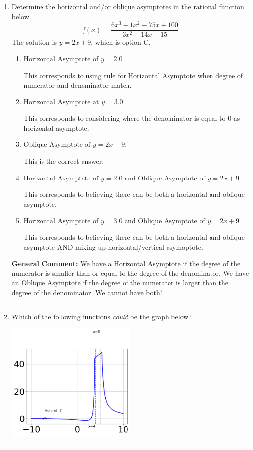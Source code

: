 \documentclass{extbook}[14pt]
\newcommand{\litem}[1]{\item #1

\rule{\textwidth}{0.4pt}}
\begin{document}
\begin{enumerate}\litem{
Determine the horizontal and/or oblique asymptotes in the rational function below.
\[ f(x) = \frac{6x^{3} -1 x^{2} -75 x + 100}{3x^{2} -14 x + 15} \]The solution is \( y = 2x + 9 \), which is option C.\begin{enumerate}[label=\Alph*.]
\item \( \text{Horizontal Asymptote of } y = 2.0  \)

This corresponds to using rule for Horizontal Asymptote when degree of numerator and denominator match.
\item \( \text{Horizontal Asymptote at } y = 3.0 \)

This corresponds to considering where the denominator is equal to 0 as horizontal asymptote.
\item \( \text{Oblique Asymptote of } y = 2x + 9. \)

This is the correct answer.
\item \( \text{Horizontal Asymptote of } y = 2.0 \text{ and Oblique Asymptote of } y = 2x + 9 \)

This corresponds to believing there can be both a horizontal and oblique asymptote.
\item \( \text{Horizontal Asymptote of } y = 3.0 \text{ and Oblique Asymptote of } y = 2x + 9 \)

This corresponds to believing there can be both a horizontal and oblique asymptote AND mixing up horizontal/vertical asymoptote.
\end{enumerate}

\textbf{General Comment:} We have a Horizontal Asymptote if the degree of the numerator is smaller than or equal to the degree of the denominator. We have an Oblique Asymptote if the degree of the numerator is larger than the degree of the denominator. We cannot have both!
}
\litem{
Which of the following functions \textit{could} be the graph below?

\begin{center}
    \includegraphics[width=0.5\textwidth]{../Figures/identifyGraphOfRationalFunctionCopyC.png}
\end{center}


}
\end{enumerate}
\end{document}
